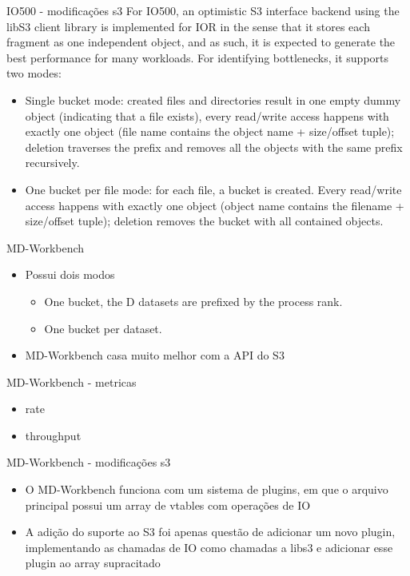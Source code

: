 \documentclass{beamer}
\begin{document}
\begin{frame}{IO500 - modificações s3}
	For IO500, an optimistic S3 interface backend using the libS3 client library is implemented for IOR in the sense that it stores each fragment as one independent object, and as
	such, it is expected to generate the best performance for many workloads.
	For identifying bottlenecks, it supports two modes:
\begin{itemize}
	\item 	Single bucket mode: created files and directories result in one empty dummy object
	(indicating that a file exists), every read/write access happens with exactly one object
	(file name contains the object name + size/offset tuple); deletion traverses the prefix
	and removes all the objects with the same prefix recursively.
	\item	One bucket per file mode: for each file, a bucket is created. Every read/write access
	happens with exactly one object (object name contains the filename + size/offset
	tuple); deletion removes the bucket with all contained objects.
	
\end{itemize}
	
\end{frame}
\begin{frame}{MD-Workbench}
	\begin{itemize}
		\item Possui dois modos
		\begin{itemize}
			\item One bucket, the D datasets are prefixed by the process rank.
			\item One bucket per dataset.
		\end{itemize}
		\item	MD-Workbench casa muito melhor com a API do S3
	\end{itemize}
\end{frame}
\begin{frame}{MD-Workbench - metricas}
	\begin{itemize}
		\item rate
		\item throughput
	\end{itemize}
\end{frame}
\begin{frame}{MD-Workbench - modificações s3}
	\begin{itemize}
		\item 	O MD-Workbench funciona com um sistema de plugins, em que o arquivo principal possui um array de vtables com operações de IO
		\item	A adição do suporte ao S3 foi apenas questão de adicionar um novo plugin, implementando as chamadas de IO como chamadas a libs3 e adicionar esse plugin ao array supracitado
	\end{itemize}

\end{frame}
\end{document}
